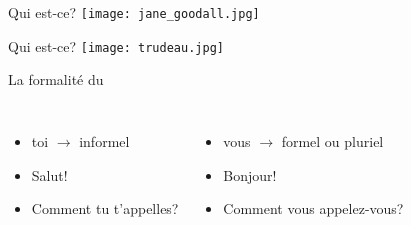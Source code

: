 \documentclass{beamer}
\begin{document}
  \begin{frame}{Qui est-ce? }
    \centering
    \texttt{[image: jane\_goodall.jpg]}


  \end{frame}

  \begin{frame}{Qui est-ce? }
    \centering
    \texttt{[image: trudeau.jpg]}


  \end{frame}




  \begin{frame}{La formalité du }
    \begin{columns}
        \begin{itemize}
          \item[] toi $\to$ informel
          \item Salut!
          \item Comment tu t'appelles?
        \end{itemize}
        \begin{itemize}
          \item[] vous $\to$ formel ou pluriel
          \item Bonjour!
          \item Comment vous appelez-vous?
        \end{itemize}
    \end{columns}
  \end{frame}
\end{document}
